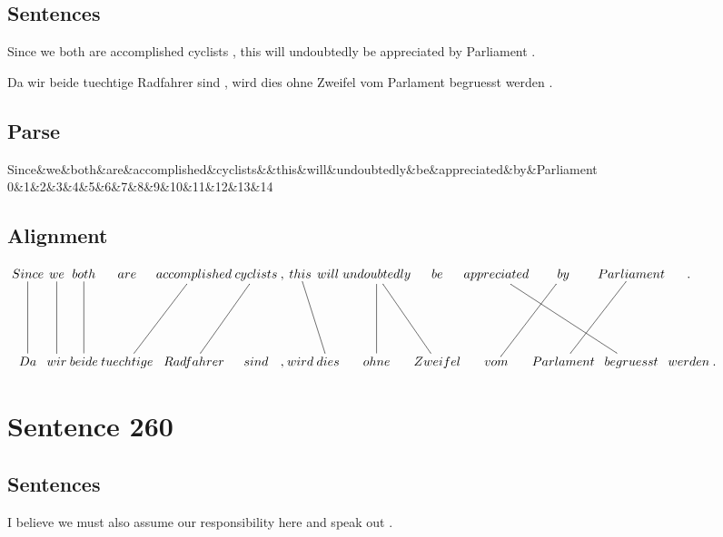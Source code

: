 \documentclass{report}
\begin{document}
\subsection*{Sentences}
Since we both are accomplished cyclists , this will undoubtedly be appreciated by Parliament .

\noindent Da wir beide tuechtige Radfahrer sind , wird dies ohne Zweifel vom Parlament begruesst werden .



\subsection*{Parse}
\begin{dependency}[theme=simple]
\begin{deptext}[column sep=.5cm, row sep=.1ex]
Since\&we\&both\&are\&accomplished\&cyclists\&\&this\&will\&undoubtedly\&be\&appreciated\&by\&Parliament\\
0\&1\&2\&3\&4\&5\&6\&7\&8\&9\&10\&11\&12\&13\&14\\
\end{deptext}
\end{dependency}


\subsection*{Alignment}
\scriptsize{
$
\xymatrix@C-2.3pc{
Since \ar @{-} [dd] & we \ar @{-} [dd] & both \ar @{-} [dd] & are & accomplished \ar @{-} [ddl] & cyclists \ar @{-} [ddl] & , & this \ar @{-} [ddr] & will & undoubtedly \ar @{-} [dd] \ar @{-} [ddr] & be & appreciated \ar @{-} [ddrr] & by \ar @{-} [ddl] & Parliament \ar @{-} [ddl] & .\\\\
Da & wir & beide & tuechtige & Radfahrer & sind & , & wird & dies & ohne & Zweifel & vom & Parlament & begruesst & werden & .
}$}
\newpage\section*{Sentence 260}

\subsection*{Sentences}
I believe we must also assume our responsibility here and speak out .
\end{document}

